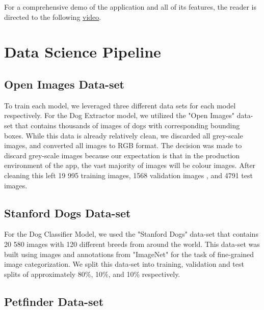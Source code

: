 \documentclass{article}
\begin{document}
\noindent  For a comprehensive demo of the application and all of its features, the reader is directed to the following \href{https://youtu.be/jVjqX4sfAKU}{video}.



\newpage

\section{Data Science Pipeline}

\subsection{Open Images Data-set}

To train each model, we leveraged three different data sets for each model respectively.  For the Dog Extractor model, we utilized the "Open Images" \cite{openimages} data-set that contains thousands of images of dogs with corresponding bounding boxes.  While this data is already relatively clean, we discarded all grey-scale images, and converted all images to RGB format.  The decision was made to discard grey-scale images because our expectation is that in the production environment of the app, the vast majority of images will be colour images.  After cleaning this left 19 995 training images, 1568 validation images , and 4791 test images.

\subsection{Stanford Dogs Data-set}

For the Dog Classifier Model, we used the "Stanford Dogs" data-set \cite{stanforddogs} that contains 20 580 images with 120 different breeds from around the world. This data-set was built using images and annotations from "ImageNet" \cite{imagenet} for the task of fine-grained image categorization.  We split this data-set into training, validation and test splits of approximately 80\%, 10\%, and 10\% respectively.

\subsection{Petfinder Data-set}
\end{document}
